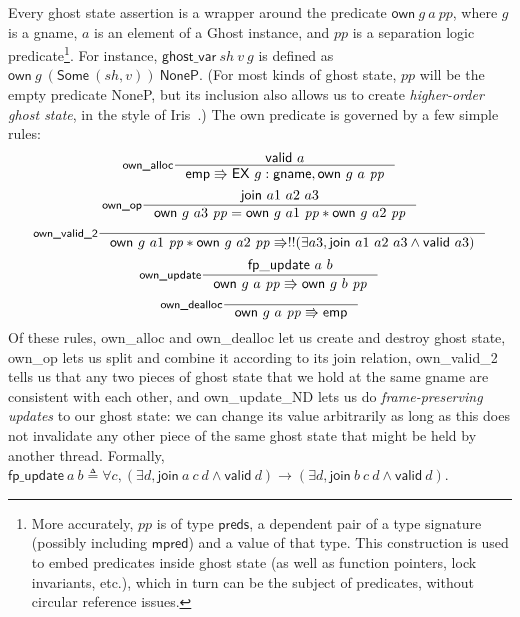 \documentclass[11pt]{article} %
\begin{document}
Every ghost state assertion is a wrapper around the predicate $\mathsf{own}\ g\ a\ \mathit{pp}$, where $g$ is a \textsf{gname}, $a$ is an element of a \textsf{Ghost} instance, and $\mathit{pp}$ is a separation logic predicate\footnote{More accurately, $\mathit{pp}$ is of type $\mathsf{preds}$, a dependent pair of a type signature (possibly including $\mathsf{mpred}$) and a value of that type. This construction is used to embed predicates inside ghost state (as well as function pointers, lock invariants, etc.), which in turn can be the subject of predicates, without circular reference issues.}. For instance, $\mathsf{ghost\_var}\ \mathit{sh}\ v\ g$ is defined as $\mathsf{own}\ g\ (\mathsf{Some}\ (\mathit{sh}, v))\ \mathsf{NoneP}$. (For most kinds of ghost state, $\mathit{pp}$ will be the empty predicate \textsf{NoneP}, but its inclusion also allows us to create \emph{higher-order ghost state}, in the style of Iris~\cite{hogs}.) The \textsf{own} predicate is governed by a few simple rules:
$$\inference[\textsf{own\_alloc}]{\mathsf{valid}\ a}{\mathsf{emp} \Rrightarrow \mathsf{EX}\ g : \mathsf{gname}, \mathsf{own}\ g\ a\ \mathit{pp}}$$
$$\inference[\textsf{own\_op}]{\mathsf{join}\ a1\ a2\ a3}{\mathsf{own}\ g\ a3\ \mathit{pp} = \mathsf{own}\ g\ a1\ \mathit{pp} * \mathsf{own}\ g\ a2\ \mathit{pp}}$$
$$\inference[\textsf{own\_valid\_2}]{}{\mathsf{own}\ g\ a1\ \mathit{pp} * \mathsf{own}\ g\ a2\ \mathit{pp} \Rrightarrow !!(\exists a3, \mathsf{join}\ a1\ a2\ a3 \land \mathsf{valid}\ a3)}$$
$$\inference[\textsf{own\_update}]{\mathsf{fp\_update}\ a\ b}{\mathsf{own}\ g\ a\ \mathit{pp} \Rrightarrow \mathsf{own}\ g\ b\ \mathit{pp}}$$
$$\inference[\textsf{own\_dealloc}]{}{\mathsf{own}\ g\ a\ \mathit{pp} \Rrightarrow \mathsf{emp}}$$
Of these rules, \textsf{own\_alloc} and \textsf{own\_dealloc} let us create and destroy ghost state, \textsf{own\_op} lets us split and combine it according to its \textsf{join} relation, \textsf{own\_valid\_2} tells us that any two pieces of ghost state that we hold at the same \textsf{gname} are consistent with each other, and \textsf{own\_update\_ND} lets us do \emph{frame-preserving updates} to our ghost state: we can change its value arbitrarily as long as this does not invalidate any other piece of the same ghost state that might be held by another thread. Formally, $\mathsf{fp\_update}\ a\ b \triangleq \forall c, (\exists d, \mathsf{join}\ a\ c\ d \land \mathsf{valid}\ d) \rightarrow (\exists d, \mathsf{join}\ b\ c\ d \land \mathsf{valid}\ d)$.
\end{document}
